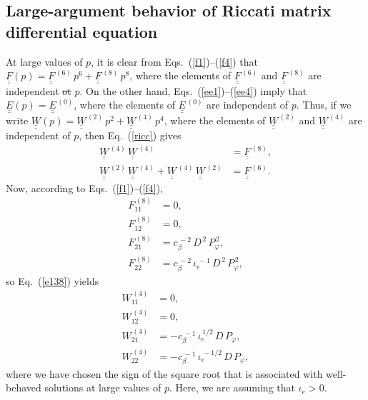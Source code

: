 \documentclass[12pt,prb,aps]{revtex4-1}
\providecommand{\DIFadd}[1]{{\protect\color{blue}\uwave{#1}}} %
\providecommand{\DIFdel}[1]{{\protect\color{red}\sout{#1}}}                      %
\providecommand{\DIFaddbegin}{} %
\providecommand{\DIFaddend}{} %
\providecommand{\DIFdelbegin}{} %
\providecommand{\DIFdelend}{} %
\begin{document}
\subsection{Large-argument behavior of Riccati matrix differential equation}
At large values of $p$, it is clear from Eqs.~(\ref{f1})--(\ref{f4}) that  $\underline{\underline{F}}(p)=\underline{\underline{F}}^{\,(6)}\,p^6+ 
\underline{\underline{F}}^{\,(8)}\,p^8$, where the elements of $\underline{\underline{F}}^{\,(6)}$ and $\underline{\underline{F}}^{\,(8)}$ are independent \DIFdelbegin \DIFdel{ot }\DIFdelend \DIFaddbegin \DIFadd{of }\DIFaddend $p$.
On the other hand, Eqs.~(\ref{ee1})--(\ref{ee4}) imply that $\underline{\underline{E}}(p)=\underline{\underline{E}}^{\,(0)}$, 
where the elements of $\underline{\underline{E}}^{\,(0)}$ are independent of $p$. 
Thus, if we write $\underline{\underline{W}}(p) =\underline{\underline{W}}^{\,(2)}\,p^2+\underline{\underline{W}}^{\,(4)}\,p^4$,
where the elements of $\underline{\underline{W}}^{\,(2)}$ and  $\underline{\underline{W}}^{\,(4)}$ are independent of $p$, then Eq.~(\ref{ricc}) gives 
\begin{align}\label{e138}
\underline{\underline{W}}^{\,(4)}\,\underline{\underline{W}}^{\,(4)}&= \underline{\underline{F}}^{\,(8)},\\[0.5ex]
\underline{\underline{W}}^{\,(2)}\,\underline{\underline{W}}^{\,(4)}+ \underline{\underline{W}}^{\,(4)}\,\underline{\underline{W}}^{\,(2)}&= 
\underline{\underline{F}}^{\,(6)}.\label{e139}
\end{align}
Now, according to Eqs.~(\ref{f1})--(\ref{f4}), 
\begin{align}
F^{\,(8)}_{11} &=0,\\[0.5ex]
F^{\,(8)}_{12} &= 0,\\[0.5ex]
F^{\,(8)}_{21} &= c_\beta^{\,-2}\,D^{\,2}\,P_\varphi^{\,2},\\[0.5ex]
F^{\,(8)}_{22} &= c_\beta^{\,-2}\,\iota_e^{\,-1}\,D^{\,2}\,P_\varphi^{\,2},
\end{align}
so Eq.~(\ref{e138}) yields\DIFaddbegin \DIFadd{, 
}\DIFaddend \begin{align}
W^{\,(4)}_{11} &=0,\\[0.5ex]
W^{\,(4)}_{12} &= 0,\\[0.5ex]
W^{\,(4)}_{21} &= -c_\beta^{\,-1}\,\iota_e^{\,1/2}\,D\,P_\varphi,\\[0.5ex]
W^{\,(4)}_{22} &=-c_\beta^{\,-1}\,\iota_e^{\,-1/2}\, D\,P_\varphi,
\end{align}
where we have chosen the sign of the square root that is associated with well-behaved solutions at large values of $p$. Here, we are  assuming that $\iota_e>0$. 
\end{document}
